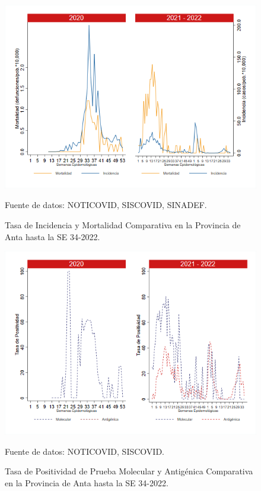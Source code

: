 \documentclass[12pt,a4paper,openany]{book}
\begin{document}
	\begin{figure}[h]
		\caption{Tasa de Incidencia y Mortalidad Comparativa en la Provincia de Anta hasta la SE 34-2022.}\label{fig:inc_mort_anta}
		\begin{center}
			\includegraphics[width=0.85\linewidth]{../figuras/incidencia_mortalidad_20_21_2.png}
		\end{center}
		{\footnotesize {Fuente de datos: NOTICOVID, SISCOVID, SINADEF.}}
	\end{figure}
	
	\begin{figure}[h]
		\caption{Tasa de Positividad de Prueba Molecular y Antigénica Comparativa en la Provincia de Anta hasta la SE 34-2022.}\label{fig:positividad_anta}
		\begin{center}
			\includegraphics[width=0.7\linewidth]{../figuras/positividad_20_21_2.png}
		\end{center}
		{\footnotesize {Fuente de datos: NOTICOVID, SISCOVID.}}
	\end{figure}
	
\end{document}
